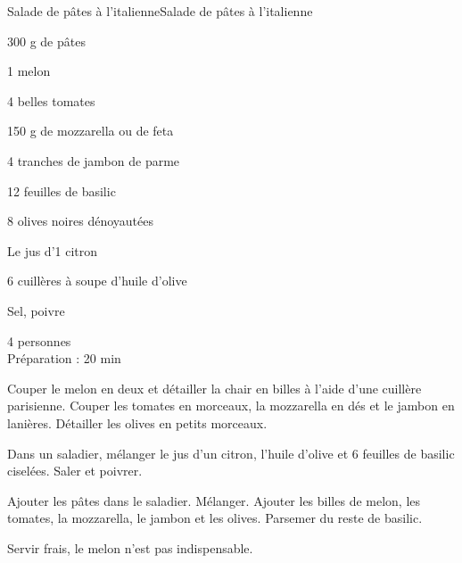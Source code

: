 \begin{recette}{Salade de pâtes à l'italienne}{Salade de pâtes à l'italienne}
\begin{ingredients}
300 g de p\^ates \par
1 melon \par
4 belles tomates \par
150 g de mozzarella ou de feta \par
4 tranches de jambon de parme \par
12 feuilles de basilic \par
8 olives noires d\'enoyaut\'ees \par
Le jus d'1 citron \par
6 cuill\`eres \`a soupe d'huile d'olive\par
Sel, poivre
\end{ingredients}
\begin{infos}
4 personnes\\
Préparation : 20 min
\end{infos}
\begin{etapes}
 \item Couper le melon en deux et détailler la chair en billes à l'aide d'une cuillère parisienne. Couper les tomates en morceaux, la mozzarella en dés et le jambon en lanières. Détailler les olives en petits morceaux.
\item Dans un saladier, mélanger le jus d'un citron, l'huile d'olive et 6 feuilles de basilic ciselées. Saler et poivrer.
\item Ajouter les pâtes dans le saladier. Mélanger. Ajouter les billes de melon, les tomates, la mozzarella, le jambon et les olives. Parsemer du reste de basilic.
\end{etapes}
\begin{conseils}
Servir frais, le melon n'est pas indispensable.
\end{conseils}
\end{recette}
